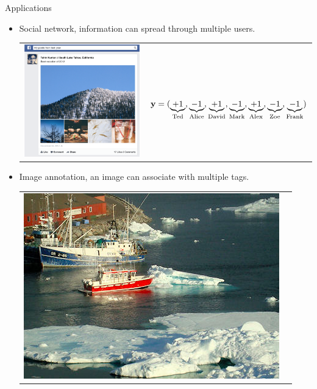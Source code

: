 \documentclass[first=dgreen,second=purple,logo=yellowexc]{aaltoslides}
\begin{document}
%
\begin{frame}{Applications}
	\begin{itemize}\footnotesize
		\item Social network, information can spread through multiple users. 
		\begin{tabular}{p{3cm}p{10cm}} 
	    \multirow{2}{*}{\includegraphics[scale = 0.06]{./figures/facebookvideo.png}} & \\
		& $\mathbf {y}=(\underbrace{+1}_{\text{Ted}},\underbrace{-1}_{\text{Alice}},\underbrace{+1}_{\text{David}},\underbrace{-1}_{\text{Mark}},\underbrace{+1}_{\text{Alex}},\underbrace{-1}_{\text{Zoe}},\underbrace{-1}_{\text{Frank}})$\\
	    \end{tabular}
		\item Image annotation, an image can associate with multiple tags.
		\begin{tabular}{p{3cm}p{10cm}}
        \multirow{2}{*}{\includegraphics[scale = 0.11]{./figures/boatsea.png}} & \\

\end{tabular}
\end{itemize}
\end{frame}
\end{document}
